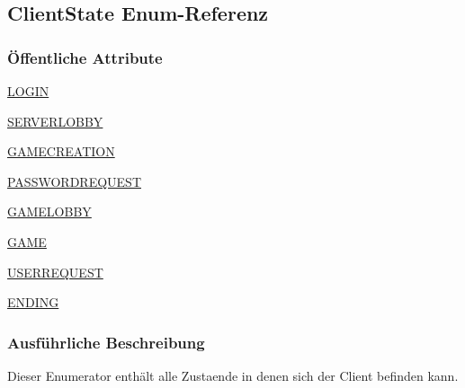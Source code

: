 \hypertarget{a00004}{\subsection{Client\-State Enum-\/\-Referenz}
\label{a00004}
}
\subsubsection*{Öffentliche Attribute}
\begin{DoxyCompactItemize}
\item 
\hypertarget{a00004_aa6647384fd9cb6b59cb7ba8659bac20c}{\hyperlink{a00004_aa6647384fd9cb6b59cb7ba8659bac20c}{L\-O\-G\-I\-N}}\label{a00004_aa6647384fd9cb6b59cb7ba8659bac20c}

\item 
\hypertarget{a00004_ad578e500267aea86bc7eef09759bfe68}{\hyperlink{a00004_ad578e500267aea86bc7eef09759bfe68}{S\-E\-R\-V\-E\-R\-L\-O\-B\-B\-Y}}\label{a00004_ad578e500267aea86bc7eef09759bfe68}

\item 
\hypertarget{a00004_af6c008fc585938f4b11b9d014489eb7b}{\hyperlink{a00004_af6c008fc585938f4b11b9d014489eb7b}{G\-A\-M\-E\-C\-R\-E\-A\-T\-I\-O\-N}}\label{a00004_af6c008fc585938f4b11b9d014489eb7b}

\item 
\hypertarget{a00004_a9f893ef7125cedf28295b685496c3b41}{\hyperlink{a00004_a9f893ef7125cedf28295b685496c3b41}{P\-A\-S\-S\-W\-O\-R\-D\-R\-E\-Q\-U\-E\-S\-T}}\label{a00004_a9f893ef7125cedf28295b685496c3b41}

\item 
\hypertarget{a00004_aae480b1d7a39e0ea178796149a6b910b}{\hyperlink{a00004_aae480b1d7a39e0ea178796149a6b910b}{G\-A\-M\-E\-L\-O\-B\-B\-Y}}\label{a00004_aae480b1d7a39e0ea178796149a6b910b}

\item 
\hypertarget{a00004_a6d03c037c786818958f542b208dbd06e}{\hyperlink{a00004_a6d03c037c786818958f542b208dbd06e}{G\-A\-M\-E}}\label{a00004_a6d03c037c786818958f542b208dbd06e}

\item 
\hypertarget{a00004_a2b70efd4e1f726674078ab58532fef60}{\hyperlink{a00004_a2b70efd4e1f726674078ab58532fef60}{U\-S\-E\-R\-R\-E\-Q\-U\-E\-S\-T}}\label{a00004_a2b70efd4e1f726674078ab58532fef60}

\item 
\hypertarget{a00004_a542dc693fd252439cce44655e06590b8}{\hyperlink{a00004_a542dc693fd252439cce44655e06590b8}{E\-N\-D\-I\-N\-G}}\label{a00004_a542dc693fd252439cce44655e06590b8}

\end{DoxyCompactItemize}


\subsubsection{Ausführliche Beschreibung}
Dieser Enumerator enthält alle Zustaende in denen sich der Client befinden kann. 